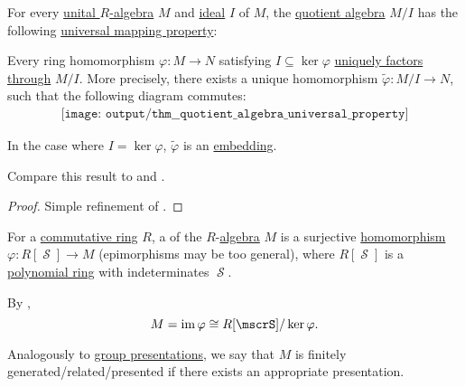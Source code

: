 \begin{theorem}\label{thm:quotient_algebra_universal_property}
  For every \hyperref[def:algebra_over_ring]{unital \( R \)-algebra} \( M \) and \hyperref[def:semiring_ideal]{ideal} \( I \) of \( M \), the \hyperref[def:algebra_over_ring/quotient]{quotient algebra} \( M / I \) has the following \hyperref[rem:universal_mapping_property]{universal mapping property}:
  \begin{displayquote}
    Every ring homomorphism \( \varphi: M \to N \) satisfying \( I \subseteq \ker \varphi \) \hyperref[def:factors_through]{uniquely factors through} \( M / I \). More precisely, there exists a unique homomorphism \( \widetilde{\varphi}: M / I \to N \), such that the following diagram commutes:
    \begin{equation}\label{eq:thm:quotient_algebra_universal_property/diagram}
      \begin{aligned}
        \texttt{[image: output/thm\_\_quotient\_algebra\_universal\_property]}
      \end{aligned}
    \end{equation}

    In the case where \( I = \ker \varphi \), \( \widetilde{\varphi} \) is an \hyperref[def:first_order_embedding]{embedding}.
  \end{displayquote}

  Compare this result to  and .
\end{theorem}
\begin{proof}
  Simple refinement of .
\end{proof}

\begin{definition}\label{def:algebra_presentation}
  For a \hyperref[def:ring/commutative]{commutative ring} \( R \), a  of the \( R \)-\hyperref[def:algebra_over_ring]{algebra} \( M \) is a surjective \hyperref[def:module/homomorphism]{homomorphism} \( \varphi: R[\mscrS] \to M \) (epimorphisms may be too general), where \( R[\mscrS] \) is a \hyperref[def:polynomial_algebra]{polynomial ring} with indeterminates \( \mscrS \).

  By ,
  \begin{equation*}
    M = \img \varphi \cong R[\mscrS] / \ker \varphi.
  \end{equation*}

  Analogously to \hyperref[def:group_presentation]{group presentations}, we say that \( M \) is finitely generated/related/presented if there exists an appropriate presentation.
\end{definition}

